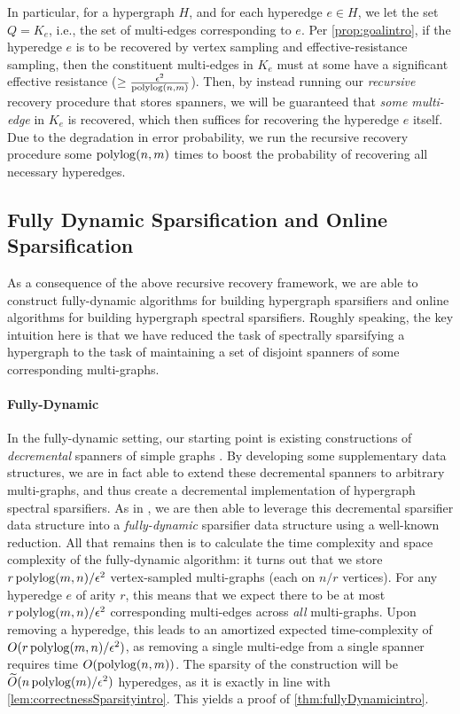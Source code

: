 \documentclass{article}
\begin{document}
In particular, for a hypergraph $H$, and for each hyperedge $e \in H$, we let the set $Q = K_e$, i.e., the set of multi-edges corresponding to $e$. Per \cref{prop:goalintro}, if the hyperedge $e$ is to be recovered by vertex sampling and effective-resistance sampling, then the constituent multi-edges in $K_e$ must at some have a significant effective resistance ($\geq \frac{\epsilon^2}{\operatorname{polylog}(n,m)}$). Then, by instead running our \emph{recursive} recovery procedure that stores spanners, we will be guaranteed that \emph{some multi-edge} in $K_e$ is recovered, which then suffices for recovering the hyperedge $e$ itself. Due to the degradation in error probability, we run the recursive recovery procedure some $\operatorname{polylog}(n,m)$ times to boost the probability of recovering all necessary hyperedges.

\subsection{Fully Dynamic Sparsification and Online Sparsification}

As a consequence of the above recursive recovery framework, we are able to construct fully-dynamic algorithms for building hypergraph sparsifiers and online algorithms for building hypergraph spectral sparsifiers. 
Roughly speaking, the key intuition here is that we have reduced the task of spectrally sparsifying a hypergraph to the task of maintaining a set of disjoint spanners of some corresponding multi-graphs. 

\paragraph{Fully-Dynamic} In the fully-dynamic setting, our starting point is existing constructions of \emph{decremental} spanners of simple graphs \cite{ADKKP16}. By developing some supplementary data structures, we are in fact able to extend these decremental spanners to arbitrary multi-graphs, and thus create a decremental implementation of hypergraph spectral sparsifiers. As in \cite{ADKKP16}, we are then able to leverage this decremental sparsifier data structure into a \emph{fully-dynamic} sparsifier data structure using a well-known reduction. All that remains then is to calculate the time complexity and space complexity of the fully-dynamic algorithm: it turns out that we store $r \operatorname{polylog}(m,n) / \epsilon^2$ vertex-sampled multi-graphs (each on $n/r$ vertices). For any hyperedge $e$ of arity $r$, this means that we expect there to be at most $r\operatorname{polylog}(m,n)/\epsilon^2$ corresponding multi-edges across \emph{all} multi-graphs. Upon removing a hyperedge, this leads to an amortized expected time-complexity of $O(r\operatorname{polylog}(m,n)/\epsilon^2)$, as removing a single multi-edge from a single spanner requires time $O(\operatorname{polylog}(n,m))$. The sparsity of the construction will be $\widetilde{O}(n \operatorname{polylog}(m) / \epsilon^2)$ hyperedges, as it is exactly in line with \cref{lem:correctnessSparsityintro}. This yields a proof of \cref{thm:fullyDynamicintro}.
\end{document}
